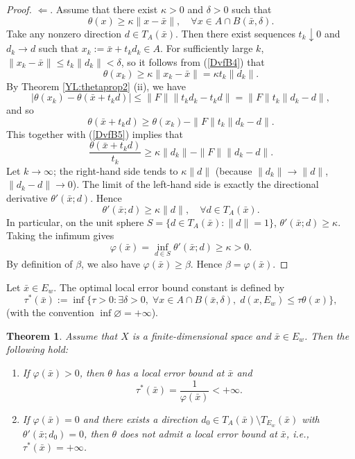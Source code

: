 \documentclass[11pt]{article}
\newtheorem{theorem}{Theorem}[section]
\begin{document}
\begin{proof}
 
 $ \Leftarrow $. 
 Assume that there exist $\kappa > 0$   and  $\delta > 0$ such that
 \begin{equation}\label{DvfB4}
\theta(x) \ge \kappa \|x - \bar x\|,  \quad  \forall x \in A \cap B(\bar x, \delta).
 \end{equation}
  Take any nonzero direction $d \in T_A(\bar x)$.  
 Then there exist sequences $t_k \downarrow 0$ and $d_k \to d$ such that $x_k := \bar x + t_k d_k \in A$. For sufficiently large $k$, $\|x_k - \bar x\| \le t_k \|d_k\| < \delta$, so  it follows from  (\ref{DvfB4})  that
 \begin{equation}\label{DvfB5}
 \theta(x_k) \ge \kappa \|x_k - \bar x\| = \kappa t_k \|d_k\|.  
\end{equation}
 By Theorem   \ref{YL:thetaprop2} (ii),  we have
 \[
 |\theta(x_k) - \theta(\bar x + t_k d)| \le \|F\| \|t_k d_k - t_k d\| = \|F\| t_k \|d_k - d\|,
 \]
 and so
 \[
 \theta(\bar x + t_k d) \ge \theta(x_k) - \|F\| t_k \|d_k - d\|.
 \]
  This together with   (\ref{DvfB5})  implies that 
 \[
 \frac{\theta(\bar x + t_k d)}{t_k} \ge \kappa \|d_k\| - \|F\| \|d_k - d\|.
 \]
 Let $k \to \infty$; the right-hand side tends to $\kappa \|d\|$ (because $\|d_k\| \to \|d\|$, $\|d_k - d\| \to 0$). The limit of the left-hand side is exactly the directional derivative $\theta'(\bar x; d)$. Hence
 \[
 \theta'(\bar x; d) \ge \kappa \|d\|,   \quad  \forall d \in T_A(\bar x).
 \]
  In particular, on the unit sphere $S = \{d \in T_A(\bar x) : \|d\| = 1\}$, $\theta'(\bar x; d) \ge \kappa$. Taking the infimum gives
 \[
	\varphi (\bar x) = \inf_{d \in S} \theta'(\bar x; d) \ge \kappa > 0.
 \]
 By definition of $\beta$, we also have $	\varphi (\bar x) \ge \beta$. Hence $\beta = 	\varphi (\bar x)$.
  \end{proof}  
 
   
 
 Let  $\bar{x} \in E_w$.  The optimal local error bound constant is defined by 
 \[
 \tau^*(\bar{x}) := \inf\{ \tau > 0 : \exists \delta > 0,\; \forall x \in A \cap B(\bar{x}, \delta),\; d(x, E_w) \le \tau \theta(x) \},
 \]
 (with the convention $\inf \varnothing = +\infty$).
 
 
 
 \begin{theorem}  \label{TYXWs}      Assume that $X$ is  a  finite-dimensional   space and  $\bar{x} \in E_w$. 
 	Then the following hold:
 	\begin{enumerate}
 		\item[(i)]   If $	\varphi(\bar{x}) > 0$, then $\theta$ has a  local error bound at $\bar x$ and
 		\[
 		\tau^*(\bar{x}) = \frac{1}{	\varphi(\bar{x})} < +\infty.
 		\]
 				\item[(ii)] 	If $	\varphi(\bar{x}) = 0$ and there exists a direction $d_0\in T_A(\bar{x})\setminus T_{E_w}(\bar{x})$ with $\theta'(\bar{x};d_0)=0$, then $\theta$ does \emph{not} admit a local error bound at $\bar{x}$, i.e., $\tau^*(\bar{x}) = +\infty$.
 		 	\end{enumerate}
 	\end{theorem}
 
\end{document}
